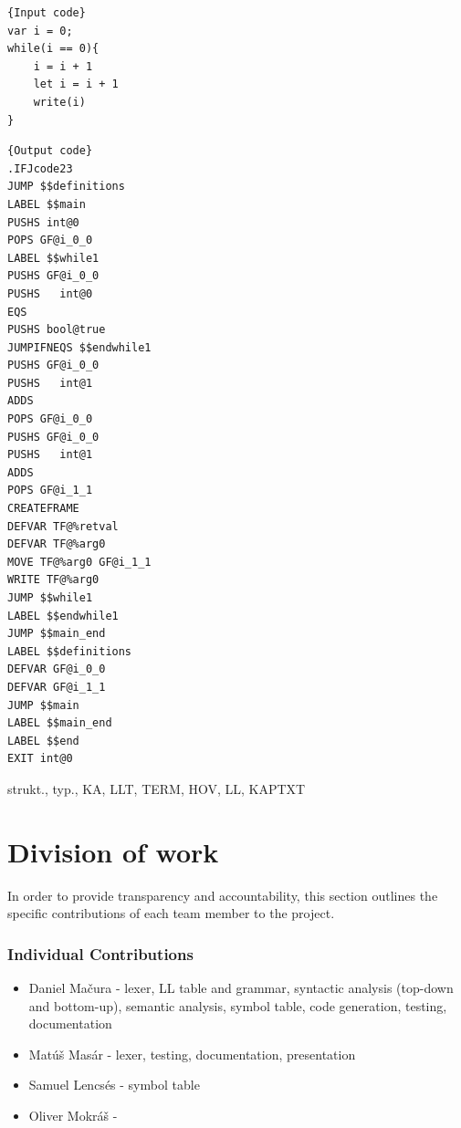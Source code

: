 \documentclass[11pt]{article}
\begin{document}
\noindent\begin{minipage}{.45\textwidth}
\label{Code example}
\begin{lstlisting}[style=PseudoStyle, caption=Input code,frame=tlrb, label={Input code}]{Input code}
var i = 0;
while(i == 0){
    i = i + 1
    let i = i + 1
    write(i)
}

\end{lstlisting}
\end{minipage}\hfill
\begin{minipage}{.45\textwidth}
\begin{lstlisting}[style=PseudoStyle, caption=Generated code,frame=tlrb, label={Output code}]{Output code}
.IFJcode23
JUMP $$definitions
LABEL $$main
PUSHS int@0
POPS GF@i_0_0
LABEL $$while1
PUSHS GF@i_0_0
PUSHS   int@0
EQS
PUSHS bool@true
JUMPIFNEQS $$endwhile1
PUSHS GF@i_0_0
PUSHS   int@1
ADDS
POPS GF@i_0_0
PUSHS GF@i_0_0
PUSHS   int@1
ADDS
POPS GF@i_1_1
CREATEFRAME
DEFVAR TF@%retval
DEFVAR TF@%arg0
MOVE TF@%arg0 GF@i_1_1
WRITE TF@%arg0
JUMP $$while1
LABEL $$endwhile1
JUMP $$main_end
LABEL $$definitions
DEFVAR GF@i_0_0
DEFVAR GF@i_1_1
JUMP $$main
LABEL $$main_end
LABEL $$end
EXIT int@0
\end{lstlisting}
\end{minipage}


strukt., typ., KA, LLT, TERM, HOV, LL, KAPTXT


\newpage 
\part{Division of work}
In order to provide transparency and accountability, this section outlines the specific contributions of each team member to the project.
\section{Individual Contributions}

\begin{itemize}
\item Daniel Mačura - lexer, LL table and grammar, syntactic analysis (top-down and bottom-up), semantic analysis, symbol table, code generation, testing, documentation

\item Matúš Masár - lexer, testing, documentation, presentation

\item Samuel Lencsés - symbol table

\item Oliver Mokráš - 
\end{itemize}

\newpage


\end{document}
